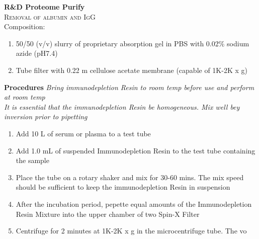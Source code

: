 \textbf{R&D Proteome Purify} 
\\
\textsc{Removal of albumin and IgG}
\\
Composition: 
\begin{enumerate}
    \item{50/50 (v/v) slurry of proprietary absorption gel in PBS with 0.02\% sodium azide (pH7.4)}
    \item{Tube filter with 0.22 \mu m cellulose acetate membrane (capable of 1K-2K x g)}
\end{enumerate}

\textbf{Procedures}
\textit{Bring immunodepletion Resin to room temp before use and perform at room temp} \\
\textit{It is essential that the immunodepletion Resin be homogeneous. Mix well bey inversion prior to pipetting}
\begin{enumerate}
    \item {Add 10 \mu L of serum or plasma to a test tube}
    \item {Add 1.0 mL of suspended Immunodepletion Resin to the test tube containing the sample}
    \item {Place the tube on a rotary shaker and mix for 30-60 mins. The mix speed should be sufficient to keep the immunodepletion Resin in suspension}
    \item {After the incubation period, pepette equal amounts of the Immunodepletion Resin Mixture into the upper chamber of two Spin-X Filter}
    \item {Centrifuge for 2 minutes at 1K-2K x g in the microcentrifuge tube. The vo}
\end{enumerate}
